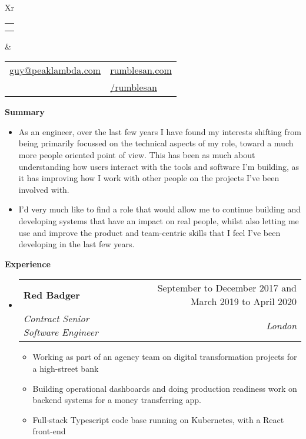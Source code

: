 \documentclass[letterpaper,12pt]{article}[leftmargin=*]
\makeatletter
\def \fullname {David Guy John}
\def \subtitle {}
\def \phoneicon {\faPhone}
\def \phonetext {07531 668 965}
\def \emailicon {\faEnvelope}
\def \emaillink {mailto:guy@peaklambda.com}
\def \emailtext {guy@peaklambda.com}
\def \githubicon {\faGithub}
\def \githublink {https://github.com/rumblesan}
\def \githubtext {/rumblesan}
\def \websiteicon {\faGlobe}
\def \websitelink {https://rumblesan.com/}
\def \websitetext {rumblesan.com}
\def \entryspacing {-0pt}
\def \phone {\phoneicon \hspace{3pt}{ \phonetext}}
\def \email {\emailicon \hspace{3pt}\href{\emaillink}{\emailtext}}
\def \github {\githubicon \hspace{3pt}\href{\githublink}{\githubtext}}
\def \website {\websiteicon \hspace{3pt}\href{\websitelink}{\websitetext}}
\renewcommand{\section}[2]{\vspace{5pt}
  \colorbox{secondary}{\color{white}\raggedbottom\normalsize{#1}{\hspace{7pt}\textbf{#2}}}
}
\newenvironment{resumeEntry}[0]{
  \begin{itemize}[leftmargin=2.5mm]
  }{
  \end{itemize}\vspace{\entryspacing}
}
\newenvironment{resumeItemList}[0]{
  \begin{itemize}[leftmargin=4.5mm]
  }{
  \end{itemize}
}
\newcommand{\resumeItem}[1]{
  \item\small{
    {#1 \vspace{-2pt}}
  }
}
\newcommand{\resumeEntryTSDL}[4]{
  \vspace{-1pt}\item[]
    \begin{tabularx}{0.97\textwidth}{X@{\hspace{60pt}}r}
      \textbf{\color{primary}#1} & {\firabook\color{accent}\small#2} \\
      \textit{\color{accent}\small#3} & \textit{\color{accent}\small#4} \\
    \end{tabularx}\vspace{-6pt}
}
\newcommand{\cvHeader}[4]{
  \begin{tabularx}{\textwidth}{Xr}
    {
      \begin{tabular}{l}
        \fontsize{35}{45}\selectfont{\color{primary}{{\textbf{\fullname}}}} \\
        {\textit{\subtitle}}
      \end{tabular}
    } & {
      \begin{tabular}{l@{\hspace{1.5em}}l}
        {\small#1} & {\small#3} \\
        {\small#2} & {\small#4}
      \end{tabular}
    }
  \end{tabularx}
}
\makeatother
\begin{document}


\cvHeader{\email}{\phone}{\website}{\github} %
\vspace{-10pt} %


\section{\faInfo}{Summary}

  \begin{resumeEntry}
    \item[]{As an engineer, over the last few years I have found my interests shifting from being primarily focussed on the technical aspects of my role, toward a much more people oriented point of view. This has been as much about understanding how users interact with the tools and software I'm building, as it has improving how I work with other people on the projects I've been involved with.}
    \item[]{I'd very much like to find a role that would allow me to continue building and developing systems that have an impact on real people, whilst also letting me use and improve the product and team-centric skills that I feel I've been developing in the last few years.}
  \end{resumeEntry}

\section{\faPieChart}{Experience}

  \begin{resumeEntry}
    \resumeEntryTSDL{Red Badger}{September to December 2017 and March 2019 to April 2020}
      {Contract Senior Software Engineer}{London}
    \begin{resumeItemList}
      \resumeItem{Working as part of an agency team on digital transformation projects for a high-street bank}
      \resumeItem{Building operational dashboards and doing production readiness work on backend systems for a money transferring app.}
      \resumeItem{Full-stack Typescript code base running on Kubernetes, with a React front-end}
    \end{resumeItemList}
  \end{resumeEntry}
\end{document}

